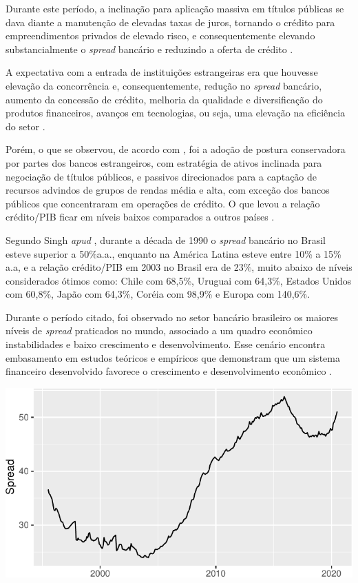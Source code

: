 \documentclass[12pt,openright,oneside,a4paper,chapter=TITLE,section=TITLE,subsection=Title,english,french,spanish,portugues,sumario=tradicional]{04-class-files/abntex2}
\begin{document}
Durante este período, a inclinação para aplicação massiva em títulos públicas se dava diante a manutenção de elevadas taxas de juros, tornando o crédito para empreendimentos privados de elevado risco, e consequentemente elevando substancialmente o \emph{spread} bancário e reduzindo a oferta de crédito \cite{camargo:2009}.

A expectativa com a entrada de instituições estrangeiras era que houvesse elevação da concorrência e, consequentemente, redução no \emph{spread} bancário, aumento da concessão de crédito, melhoria da qualidade e diversificação do produtos financeiros, avanços em tecnologias, ou seja, uma elevação na eficiência do setor \cite{camargo:2009}.

Porém, o que se observou, de acordo com \textcite{camargo:2009}, foi a adoção de postura conservadora por partes dos bancos estrangeiros, com estratégia de ativos inclinada para negociação de títulos públicos, e passivos direcionados para a captação de recursos advindos de grupos de rendas média e alta, com exceção dos bancos públicos que concentraram em operações de crédito. O que levou a relação crédito/PIB ficar em níveis baixos comparados a outros países \cite{camargo:2009, leal:2006}.

Segundo Singh \emph{apud} \textcite{leal:2006}, durante a década de 1990 o \emph{spread} bancário no Brasil esteve superior a 50\%a.a., enquanto na América Latina esteve entre 10\% a 15\% a.a, e a relação crédito/PIB em 2003 no Brasil era de 23\%, muito abaixo de níveis considerados ótimos como: Chile com 68,5\%, Uruguai com 64,3\%, Estados Unidos com 60,8\%, Japão com 64,3\%, Coréia com 98,9\% e Europa com 140,6\%.

Durante o período citado, foi observado no setor bancário brasileiro os maiores níveis de \emph{spread} praticados no mundo, associado a um quadro econômico instabilidades e baixo crescimento e desenvolvimento. Esse cenário encontra embasamento em estudos teóricos e empíricos que demonstram que um sistema financeiro desenvolvido favorece o crescimento e desenvolvimento econômico \cite{levine:1997, matos:2003}.


\begin{center}\includegraphics{jacksontorres_files/figure-latex/credit gdp-1} \end{center}
\end{document}
